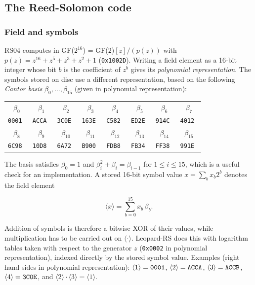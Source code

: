 \subsection{The Reed-Solomon code}
\label{rs04-code}

\subsubsection{Field and symbols}

RS04 computes in GF($2^{16}$) = GF(2)$[z] / (p(z))$ with
$p(z) = z^{16} + z^5 + z^3 + z^2 + 1$ ({\tt 0x1002D}). Writing a field
element as a 16-bit integer whose bit $b$ is the coefficient of $z^b$ gives
its {\em polynomial representation}. The symbols stored on disc use a
different representation, based on the following {\em Cantor basis}
$\beta_0, \ldots, \beta_{15}$ (given in polynomial representation):

\medskip
\begin{center}
\begin{tabular}{|c|c|c|c|c|c|c|c|}
\hline
$\beta_0$ & $\beta_1$ & $\beta_2$ & $\beta_3$ & $\beta_4$ & $\beta_5$ & $\beta_6$ & $\beta_7$ \\
\tt 0001 & \tt ACCA & \tt 3C0E & \tt 163E & \tt C582 & \tt ED2E & \tt 914C & \tt 4012 \\
\hline
$\beta_8$ & $\beta_9$ & $\beta_{10}$ & $\beta_{11}$ & $\beta_{12}$ & $\beta_{13}$ & $\beta_{14}$ & $\beta_{15}$ \\
\tt 6C98 & \tt 10D8 & \tt 6A72 & \tt B900 & \tt FDB8 & \tt FB34 & \tt FF38 & \tt 991E \\
\hline
\end{tabular}
\end{center}
\medskip

The basis satisfies $\beta_0 = 1$ and $\beta_i^2 + \beta_i = \beta_{i-1}$ for
$1 \le i \le 15$, which is a useful check for an implementation.
A stored 16-bit symbol value $x = \sum_b x_b 2^b$ denotes the field element

\[ \langle x \rangle = \sum_{b=0}^{15} x_b\,\beta_b . \]

Addition of symbols is therefore a bitwise XOR of their values, while
multiplication has to be carried out on $\langle\cdot\rangle$. Leopard-RS
does this with logarithm tables taken with respect to the generator $z$
({\tt 0x0002} in polynomial representation), indexed directly by the
stored symbol value. Examples (right hand sides in polynomial
representation): $\langle 1 \rangle = {\tt 0001}$,
$\langle 2 \rangle = {\tt ACCA}$, $\langle 3 \rangle = {\tt ACCB}$,
$\langle 4 \rangle = {\tt 3C0E}$, and
$\langle 2 \rangle \cdot \langle 3 \rangle = \langle 1 \rangle$.

